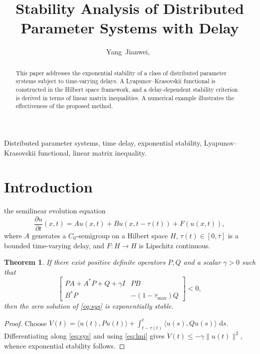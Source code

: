 \documentclass[journal,11pt]{IEEEtran}
\title{Stability Analysis of Distributed Parameter Systems with Delay}
\author{Yang~Jianwei,~\IEEEmembership{Member,~IEEE}}
\newtheorem{theorem}{Theorem}
\newcommand{\dd}{\,\mathrm{d}}
\begin{document}
\maketitle

\begin{abstract}
This paper addresses the exponential stability of a class of
distributed parameter systems subject to time-varying delays. A
Lyapunov--Krasovskii functional is constructed in the Hilbert space
framework, and a delay-dependent stability criterion is derived in
terms of linear matrix inequalities. A numerical example illustrates
the effectiveness of the proposed method.
\end{abstract}

\begin{IEEEkeywords}
Distributed parameter systems, time delay, exponential stability,
Lyapunov--Krasovskii functional, linear matrix inequality.
\end{IEEEkeywords}

\IEEEpeerreviewmaketitle

\section{Introduction}
 the semilinear evolution equation
\begin{equation}\label{eq:sys}
  \frac{\partial u}{\partial t}(x,t)
  = A u(x,t) + B u(x,t-\tau(t)) + F(u(x,t)),
\end{equation}
where $A$ generates a $C_0$-semigroup on a Hilbert space $H$,
$\tau(t)\in[0,\bar\tau]$ is a bounded time-varying delay, and
$F:H\to H$ is Lipschitz continuous.

\begin{theorem}
If there exist positive definite operators $P,Q$ and a scalar
$\gamma>0$ such that
\begin{equation}\label{eq:lmi}
  \begin{bmatrix}
    PA + A^*P + Q + \gamma I & PB \\
    B^*P & -(1-\dot\tau_{\max})Q
  \end{bmatrix} < 0,
\end{equation}
then the zero solution of \eqref{eq:sys} is exponentially stable.
\end{theorem}

\begin{proof}
Choose $V(t)=\langle u(t),Pu(t)\rangle+\int_{t-\tau(t)}^t\langle u(s),Qu(s)\rangle\,\dd s$.
Differentiating along \eqref{eq:sys} and using \eqref{eq:lmi} gives
$\dot V(t)\le -\gamma\|u(t)\|^2$, whence exponential stability follows.
\end{proof}
\end{document}
